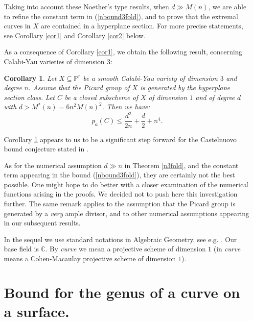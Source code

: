 \documentclass[9pt,a4paper]{amsart}
\theoremstyle{plain}
\newtheorem{corollary}[theorem]{Corollary}
\theoremstyle{definition}
\theoremstyle{remark}
\begin{document}
\smallskip
Taking into account these Noether's type results, when $d\gg M(n)$,
we are able to refine the constant term in (\ref{nbound3fold}), and
to prove that the extremal curves in $X$ are contained in a
hyperplane section. For more precise statements, see Corollary
\ref{cor1} and Corollary \ref{cor2} below.

\smallskip
As a consequence of Corollary \ref{cor1}, we obtain the following
result, concerning Calabi-Yau varieties of dimension $3$:
\smallskip
\begin{corollary}\label{ncor3}
Let $X\subseteq\mathbb P^r$ be a smooth Calabi-Yau variety of
dimension $3$ and degree $n$. Assume that the Picard group of $X$ is
generated by the hyperplane section class. Let $C$ be  a closed subscheme of $X$ of dimension $1$
and of degree $d$ with $d>M^*(n)=6n^2M(n)^2$. Then we have:
$$
p_a(C) \leq \frac{d^2}{2n}+\frac{d}{2}+n^4.
$$
\end{corollary}
\smallskip
Corollary \ref{ncor3} appears to us to be a significant step forward
for the Castelnuovo bound conjecture
stated in \cite[Conjecture 1.1]{Liu}.


\smallskip
As for the  numerical assumption  $d\gg n$ in Theorem \ref{n3fold},
and the constant term appearing in the bound (\ref{nbound3fold}),
they are certainly not the best possible. One might hope to do
better with a closer examination of the numerical functions arising
in the proofs. We decided not to push here this investigation
further. The same remark applies to the assumption that the Picard
group is generated by a {\it very} ample divisor, and to other
numerical assumptions appearing in our subsequent results.


\smallskip
In the sequel we use standard notations in Algebraic Geometry, see
e.g. \cite{Hartshorne2}. Our base field is $\mathbb C$. By {\it
curve} we mean  a projective scheme of dimension $1$ (in \cite{Liu}
{\it curve} means a Cohen-Macaulay projective scheme of dimension
$1$).



\section{Bound for the genus of a curve on a surface.}
\end{document}
